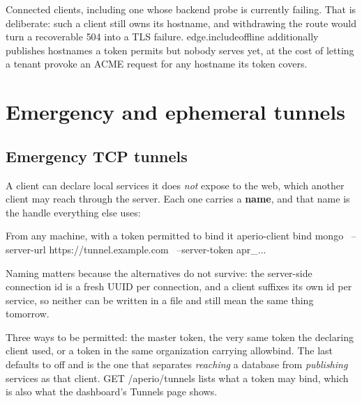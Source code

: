 \documentclass[11pt,a4paper,oneside]{book}
\newcommand{\aperiobreakableunderscore}{\textunderscore\allowbreak}
\newcommand{\aperiocodebreaks}{\XeTeXinterchartokenstate=1 }
\newcommand{\aperiocodebreaks}{}
\DeclareRobustCommand{\code}[1]{{\ttfamily\small\aperiocodebreaks
  \let\_\aperiobreakableunderscore#1}}
\begin{document}
Connected clients, including one whose backend probe is currently
failing. That is deliberate: such a client still owns its hostname, and
withdrawing the route would turn a recoverable \code{504} into a TLS
failure. \code{edge.include\_offline} additionally publishes
hostnames a token permits but nobody serves yet, at the cost of letting a
tenant provoke an ACME request for any hostname its token covers.

\chapter{Emergency and ephemeral tunnels}
\label{ch:emergency}

\section{Emergency TCP tunnels}

A client can declare local services it does \emph{not} expose to the web,
which another client may reach through the server. Each one carries a
\textbf{name}, and that name is the handle everything else uses:


\begin{codecard}[aperiosh]{From any machine, with a token permitted to bind it}
aperio-client bind mongo \
  --server-url https://tunnel.example.com \
  --server-token apr_...
\end{codecard}

Naming matters because the alternatives do not survive: the server-side
connection id is a fresh UUID per connection, and a client suffixes its own
id per service, so neither can be written in a file and still mean the same
thing tomorrow.

Three ways to be permitted: the master token, the very same token the
declaring client used, or a token in the same organization carrying
\code{allow\_bind}. The last defaults to off and is the one that separates
\emph{reaching} a database from \emph{publishing} services as that client.
\code{GET /aperio/tunnels} lists what a token may bind, which is also what
the dashboard's Tunnels page shows.
\end{document}
